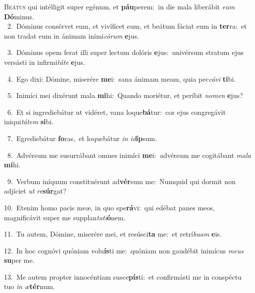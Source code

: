 \lettrine{\initial\textcolor{\initialcolor}{B}}{eátus} qui intélligit super egénum, et \textbf{páu}\-perem:~\star in die mala liberábit \textit{e}\-\textit{um} \textbf{Dó}\-minus.\\
{\numbfont\textcolor{\numbcolor}{~2.}}~Dóminus consérvet eum, et vivíficet eum, et beátum fáciat eum in \textbf{ter}\-ra:~\star et non tradat eum in ánimam inimi\-\textit{có}\-\textit{rum} \textbf{e}\-jus.\par
{\numbfont\textcolor{\numbcolor}{~3.}}~Dóminus opem ferat illi super lectum dolóris \textbf{e}\-jus:~\star univérsum stratum ejus versásti in infirmi\-\textit{tá}\-\textit{te} \textbf{e}\-jus.\par
{\numbfont\textcolor{\numbcolor}{~4.}}~Ego dixi: Dómine, miserére \textbf{me}\-i:~\star sana ánimam meam, quia pec\-\textit{cá}\-\textit{vi} \textbf{ti}\-bi.\par
{\numbfont\textcolor{\numbcolor}{~5.}}~Inimíci mei dixérunt mala \textbf{mi}\-hi:~\star Quando moriétur, et períbit \textit{no}\-\textit{men} \textbf{e}\-jus?\par
{\numbfont\textcolor{\numbcolor}{~6.}}~Et si ingrediebátur ut vidéret, vana loque\-\textbf{bá}\-tur:~\star cor ejus congregávit iniqui\-\textit{tá}\-\textit{tem} \textbf{si}\-bi.\par
{\numbfont\textcolor{\numbcolor}{~7.}}~Egrediebátur \textbf{fo}\-ras,~\star et loquebátur \textit{in} \textit{id}\-\textbf{íp}sum.\par
{\numbfont\textcolor{\numbcolor}{~8.}}~Advérsum me susurrábant omnes inimíci \textbf{me}\-i:~\star advérsum me cogitábant \textit{ma}\-\textit{la} \textbf{mi}\-hi.\par
{\numbfont\textcolor{\numbcolor}{~9.}}~Verbum iníquum constituérunt ad\-\textbf{vér}\-sum me:~\star Numquid qui dormit non adjíciet \textit{ut} \textit{re}\-\textbf{súr}gat?\par
{\numbfont\textcolor{\numbcolor}{10.}}~Etenim homo pacis meæ, in quo spe\-\textbf{rá}\-vi:~\star qui edébat panes meos, magnificávit super me supplan\-\textit{ta}\-\textit{ti}\textbf{ó}nem.\par
{\numbfont\textcolor{\numbcolor}{11.}}~Tu autem, Dómine, miserére mei, et resúsci\textbf{ta} me:~\star et retrí\-\textit{bu}\-\textit{am} \textbf{e}\-is.\par
{\numbfont\textcolor{\numbcolor}{12.}}~In hoc cognóvi quóniam volu\-\textbf{ís}\-ti me:~\star quóniam non gaudébit inimícus \textit{me}\-\textit{us} \textbf{su}\-per me.\par
{\numbfont\textcolor{\numbcolor}{13.}}~Me autem propter innocéntiam susce\-\textbf{pís}\-ti:~\star et confirmásti me in conspéctu tuo \textit{in} \textit{æ}\-\textbf{tér}num.\par
